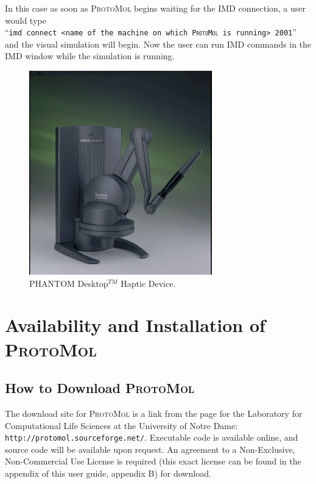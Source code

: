\documentclass[11pt]{report}
\newcommand{\ProtoMol}{\textsc{ProtoMol }}
\providecommand{\ttsmall}[1]{\texttt{\small\mbox{#1}}}
\begin{document}
In this case as soon as \ProtoMol begins waiting for the IMD
connection, a user would type\\ ``\ttsmall{imd connect <name of the
    machine on which \ProtoMol is running> 2001}'' and the visual
simulation will begin.  Now the user can run IMD commands in the IMD
window while the simulation is running.
\begin{figure}[htb]
   \centerline{\includegraphics[width=8cm]{hapticdevice.jpg}}
    \caption{ PHANTOM Desktop$^{TM}$ Haptic Device.  \label{fig:hapticdevice}}
\end{figure}


\chapter{Availability and Installation of \ProtoMol}

\section{How to Download \ProtoMol}

The download site for \ProtoMol is a link from the page for the
Laboratory for Computational Life Sciences at the University of Notre
Dame: \texttt{http://protomol.sourceforge.net/}.
Executable code is available online, and source code will be available
upon request.  An agreement to a Non-Exclusive, Non-Commercial Use
License is required (this exact license can be found in the appendix
of this user guide, appendix B) for download.

\end{document}
